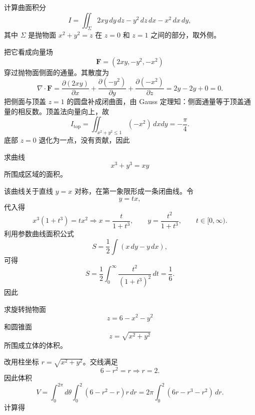 \begin{question}[曲面积分]

计算曲面积分
\[
 I=\iint_{\Sigma}2xy\,dy\,dz-y^2\,dz\,dx-x^2\,dx\,dy,
\]
其中 $\Sigma$ 是抛物面 $x^2+y^2=z$ 在 $z=0$ 和 $z=1$ 之间的部分，取外侧。

\begin{solution}

把它看成向量场
\[
 \mathbf F=(2xy,-y^2,-x^2)
\]
穿过抛物面侧面的通量。其散度为
\[
 \nabla\cdot\mathbf F=\frac{\partial(2xy)}{\partial x}+\frac{\partial(-y^2)}{\partial y}+\frac{\partial(-x^2)}{\partial z}=2y-2y+0=0.
\]
把侧面与顶盖 $z=1$ 的圆盘补成闭曲面，由 Gauss 定理知：侧面通量等于顶盖通量的相反数。顶盖法向量向上，故
\[
 I_{\text{top}}=\iint_{x^2+y^2\le1}(-x^2)\,dxdy=-\frac{\pi}{4}.
\]
底部 $z=0$ 退化为一点，没有贡献，因此

\end{solution}
\end{question}

\begin{question}[区域面积]

求曲线
\[
 x^3+y^3=xy
\]
所围成区域的面积。

\begin{solution}

该曲线关于直线 $y=x$ 对称，在第一象限形成一条闭曲线。令
\[
 y=tx,
\]
代入得
\[
 x^3(1+t^3)=tx^2\Longrightarrow x=\frac{t}{1+t^3},\qquad y=\frac{t^2}{1+t^3},\qquad t\in[0,\infty).
\]
利用参数曲线面积公式
\[
 S=\frac12\int (x\,dy-y\,dx),
\]
可得
\[
 S=\frac12\int_0^{\infty}\frac{t^2}{(1+t^3)^2}\,dt=\frac16.
\]
因此

\end{solution}
\end{question}

\begin{question}[立体体积]

求旋转抛物面
\[
 z=6-x^2-y^2
\]
和圆锥面
\[
 z=\sqrt{x^2+y^2}
\]
所围成立体的体积。

\begin{solution}

改用柱坐标 $r=\sqrt{x^2+y^2}$。交线满足
\[
 6-r^2=r
 \Longrightarrow r=2.
\]
因此体积
\[
 V=\int_0^{2\pi}\!d\theta\int_0^2 (6-r^2-r)r\,dr
 =2\pi\int_0^2(6r-r^3-r^2)\,dr.
\]
计算得

\end{solution}
\end{question}


